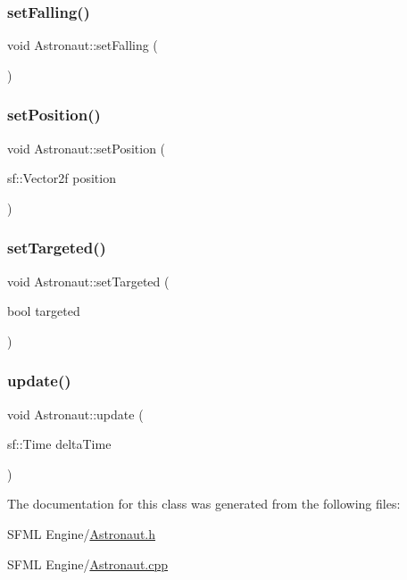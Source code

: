 \mbox{\label{class_astronaut_aca642a5da85bd7546c7750d87ffdad5c}} 
\subsubsection{\texorpdfstring{set\+Falling()}{setFalling()}}
{\footnotesize\ttfamily void Astronaut\+::set\+Falling (\begin{DoxyParamCaption}{ }\end{DoxyParamCaption})}

\mbox{\label{class_astronaut_a76e03abf8dd510b493c4e079015725d8}} 
\subsubsection{\texorpdfstring{set\+Position()}{setPosition()}}
{\footnotesize\ttfamily void Astronaut\+::set\+Position (\begin{DoxyParamCaption}\item[{sf\+::\+Vector2f}]{position }\end{DoxyParamCaption})}

\mbox{\label{class_astronaut_aad3dde72837f3a51c18cfe70ce881f93}} 
\subsubsection{\texorpdfstring{set\+Targeted()}{setTargeted()}}
{\footnotesize\ttfamily void Astronaut\+::set\+Targeted (\begin{DoxyParamCaption}\item[{bool}]{targeted }\end{DoxyParamCaption})}

\mbox{\label{class_astronaut_a2df268d2fa9a1783fda0c772130cddd2}} 
\subsubsection{\texorpdfstring{update()}{update()}}
{\footnotesize\ttfamily void Astronaut\+::update (\begin{DoxyParamCaption}\item[{sf\+::\+Time}]{delta\+Time }\end{DoxyParamCaption})}



The documentation for this class was generated from the following files\+:\begin{DoxyCompactItemize}
\item 
S\+F\+M\+L Engine/\hyperlink{_astronaut_8h}{Astronaut.\+h}\item 
S\+F\+M\+L Engine/\hyperlink{_astronaut_8cpp}{Astronaut.\+cpp}\end{DoxyCompactItemize}
